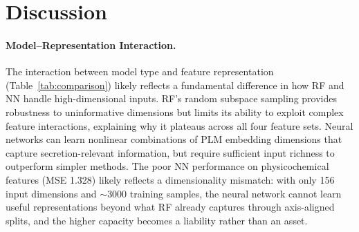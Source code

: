\documentclass[12pt]{article}
\begin{document}
\section{Discussion}
\label{sec:discussion}

\begin{table}[H]
\centering
\small
\caption{Summary of key results.}
\label{tab:summary}
\end{table}

\paragraph{Model--Representation Interaction.}
The interaction between model type and feature representation (Table~\ref{tab:comparison}) likely reflects a fundamental difference in how RF and NN handle high-dimensional inputs.
RF's random subspace sampling provides robustness to uninformative dimensions but limits its ability to exploit complex feature interactions, explaining why it plateaus across all four feature sets.
Neural networks can learn nonlinear combinations of PLM embedding dimensions that capture secretion-relevant information, but require sufficient input richness to outperform simpler methods.
The poor NN performance on physicochemical features (MSE 1.328) likely reflects a dimensionality mismatch: with only 156 input dimensions and $\sim$3000 training samples, the neural network cannot learn useful representations beyond what RF already captures through axis-aligned splits, and the higher capacity becomes a liability rather than an asset.
\end{document}
